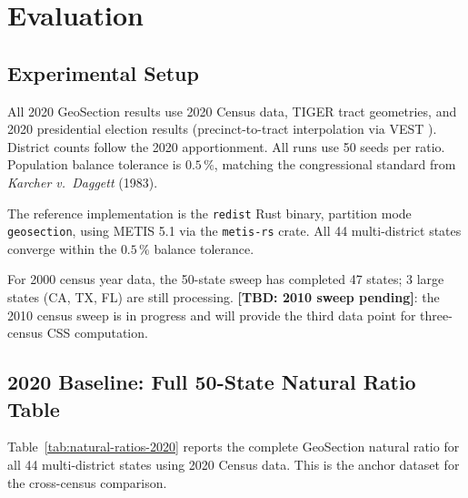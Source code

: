 \section{Evaluation}
\label{sec:evaluation}

\subsection{Experimental Setup}

All 2020 GeoSection results use 2020 Census data, TIGER tract geometries,
and 2020 presidential election results (precinct-to-tract interpolation via
VEST \citep{fekrazad2021}).
District counts follow the 2020 apportionment.
All runs use 50 seeds per ratio.
Population balance tolerance is $0.5\,\%$, matching the congressional standard
from \emph{Karcher v.\ Daggett} (1983).

The reference implementation is the \texttt{redist} Rust binary, partition
mode \texttt{geosection}, using METIS 5.1 via the \texttt{metis-rs} crate.
All 44 multi-district states converge within the $0.5\,\%$ balance tolerance.

For 2000 census year data, the 50-state sweep has completed 47 states;
3 large states (CA, TX, FL) are still processing.
\textbf{[TBD: 2010 sweep pending]}: the 2010 census sweep is in progress and
will provide the third data point for three-census CSS computation.

\subsection{2020 Baseline: Full 50-State Natural Ratio Table}
\label{sec:2020-baseline}

Table~\ref{tab:natural-ratios-2020} reports the complete GeoSection natural
ratio for all 44 multi-district states using 2020 Census data.
This is the anchor dataset for the cross-census comparison.

